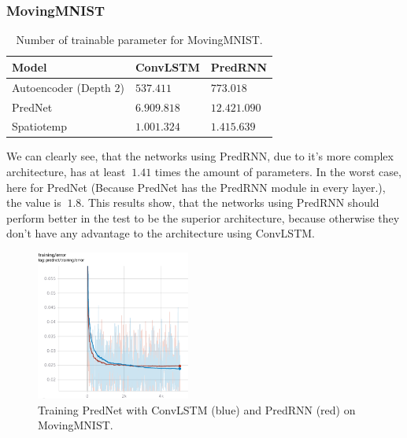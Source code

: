   \subsubsection{MovingMNIST}
   \begin{table}[H]
    \begin{center}
     \begin{tabular}{| l | l | l |}\hline
      \textbf{Model} & \textbf{ConvLSTM} & \textbf{PredRNN} \\\hline
      Autoencoder (Depth $2$) & $537.411$ & $773.018$ \\\hline
      PredNet & $6.909.818$ & $12.421.090$ \\\hline
      Spatiotemp & $1.001.324$ & $1.415.639$ \\\hline
     \end{tabular}
    \end{center}
    \caption{Number of trainable parameter for MovingMNIST.}
   \end{table}\noindent
   We can clearly see, that the networks using PredRNN, due to it's more complex architecture, has at least $~1.41$ times the amount of parameters. In the worst
   case, here for PredNet (Because PredNet has the PredRNN module in every layer.), the value is $~1.8$. This results show, that the networks using PredRNN
   should perform better in the test to be the superior architecture, because otherwise they don't have any advantage to the architecture using ConvLSTM.
   \begin{figure}[H]
    \includegraphics[width=0.45\textwidth]{../Images/prednet_mnist_training.png}
    \centering
    \caption{Training PredNet with ConvLSTM (blue) and PredRNN (red) on MovingMNIST.}
    \label{fig:prednet_mnist_training}
   \end{figure}\noindent
